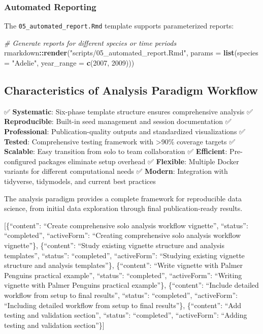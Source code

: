 \documentclass[
]{article}
\newenvironment{Shaded}{\begin{snugshade}}{\end{snugshade}}
\newcommand{\AttributeTok}[1]{\textcolor[rgb]{0.13,0.29,0.53}{#1}}
\newcommand{\CommentTok}[1]{\textcolor[rgb]{0.56,0.35,0.01}{\textit{#1}}}
\newcommand{\DecValTok}[1]{\textcolor[rgb]{0.00,0.00,0.81}{#1}}
\newcommand{\FunctionTok}[1]{\textcolor[rgb]{0.13,0.29,0.53}{\textbf{#1}}}
\newcommand{\NormalTok}[1]{#1}
\newcommand{\SpecialCharTok}[1]{\textcolor[rgb]{0.81,0.36,0.00}{\textbf{#1}}}
\newcommand{\StringTok}[1]{\textcolor[rgb]{0.31,0.60,0.02}{#1}}
\begin{document}
\subsubsection{Automated Reporting}\label{automated-reporting}

The \texttt{05\_automated\_report.Rmd} template supports parameterized
reports:

\begin{Shaded}
\begin{Highlighting}[]
\CommentTok{\# Generate reports for different species or time periods}
\NormalTok{rmarkdown}\SpecialCharTok{::}\FunctionTok{render}\NormalTok{(}\StringTok{"scripts/05\_automated\_report.Rmd"}\NormalTok{,}
                  \AttributeTok{params =} \FunctionTok{list}\NormalTok{(}\AttributeTok{species =} \StringTok{"Adelie"}\NormalTok{,}
                               \AttributeTok{year\_range =} \FunctionTok{c}\NormalTok{(}\DecValTok{2007}\NormalTok{, }\DecValTok{2009}\NormalTok{)))}
\end{Highlighting}
\end{Shaded}

\subsection{Characteristics of Analysis Paradigm
Workflow}\label{characteristics-of-analysis-paradigm-workflow}

✅ \textbf{Systematic}: Six-phase template structure ensures
comprehensive analysis ✅ \textbf{Reproducible}: Built-in seed
management and session documentation ✅ \textbf{Professional}:
Publication-quality outputs and standardized visualizations ✅
\textbf{Tested}: Comprehensive testing framework with \textgreater90\%
coverage targets ✅ \textbf{Scalable}: Easy transition from solo to team
collaboration ✅ \textbf{Efficient}: Pre-configured packages eliminate
setup overhead ✅ \textbf{Flexible}: Multiple Docker variants for
different computational needs ✅ \textbf{Modern}: Integration with
tidyverse, tidymodels, and current best practices

The analysis paradigm provides a complete framework for reproducible
data science, from initial data exploration through final
publication-ready results.

{[}\{``content'': ``Create comprehensive solo analysis workflow
vignette'', ``status'': ``completed'', ``activeForm'': ``Creating
comprehensive solo analysis workflow vignette''\}, \{``content'':
``Study existing vignette structure and analysis templates'',
``status'': ``completed'', ``activeForm'': ``Studying existing vignette
structure and analysis templates''\}, \{``content'': ``Write vignette
with Palmer Penguins practical example'', ``status'': ``completed'',
``activeForm'': ``Writing vignette with Palmer Penguins practical
example''\}, \{``content'': ``Include detailed workflow from setup to
final results'', ``status'': ``completed'', ``activeForm'': ``Including
detailed workflow from setup to final results''\}, \{``content'': ``Add
testing and validation section'', ``status'': ``completed'',
``activeForm'': ``Adding testing and validation section''\}{]}
\end{document}
